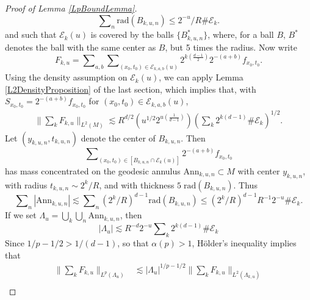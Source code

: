 \begin{proof}[Proof of Lemma \ref{LpBoundLemma}]
%
\begin{equation}
    \sum\nolimits_n \text{rad}(B_{k,u,n}) \leq 2^{-u} / R \# \mathcal{E}_k.
\end{equation}
%
and such that $\mathcal{E}_k(u)$ is covered by the balls $\{ B_{k,u,n}^* \}$, where, for a ball $B$, $B^*$ denotes the ball with the same center as $B$, but 5 times the radius. Now write
%
\begin{equation}
    F_{k,u} = \sum\nolimits_{a,b} \sum\nolimits_{(x_0,t_0) \in \mathcal{E}_{k,a,b}(u)} 2^{k \left( \frac{d-1}{2} \right)} 2^{-(a+b)} f_{x_0,t_0}.
\end{equation}
%
Using the density assumption on $\mathcal{E}_k(u)$, we can apply Lemma \ref{L2DensityProposition} of the last section, which implies that, with ${S\!}_{x_0,t_0} = 2^{-(a+b)} f_{x_0,t_0}$ for $(x_0,t_0) \in \mathcal{E}_{k,a,b}(u)$,
%
\begin{equation} \label{DOIWAJOIAJVOIWAJFOIWF}
\begin{split}
    \Big\| \sum\nolimits_k F_{k,u} \Big\|_{L^2(M)} \lesssim R^{d/2} \left( u^{1/2} 2^{u \left( \frac{1}{d-1} \right)} \right) \left( \sum\nolimits_k 2^{k(d-1)} \# \mathcal{E}_k \right)^{1/2}.
\end{split}
\end{equation}
%
Let $(y_{k,u,n}, t_{k,u,n})$ denote the center of $B_{k,u,n}$. Then
%
\begin{equation}
    \sum\nolimits_{(x_0,t_0) \in [B_{k,u,n} \cap \mathcal{E}_k(u)]} 2^{-(a+b)} f_{x_0,t_0}
\end{equation}
%
has mass concentrated on the geodesic annulus $\text{Ann}_{k,u,n} \subset M$ with center $y_{k,u,n}$, with radius $t_{k,u,n} \sim 2^{k} / R$, and with thickness $5\; \text{rad}(B_{k,u,n})$. Thus
%
\begin{equation}
    \sum\nolimits_n |\text{Ann}_{k,u,n}| \lesssim \sum\nolimits_{n} (2^{k} / R)^{d-1} \text{rad}(B_{k,u,n}) \leq (2^{k}/R)^{d-1} R^{-1} 2^{-u} \# \mathcal{E}_k.
\end{equation}
%
If we set $\Lambda_u = \bigcup_k \bigcup_n \text{Ann}_{k,u,n}$, then
%
\begin{equation}
    |\Lambda_u| \lesssim R^{-d} 2^{-u} \sum\nolimits_k 2^{k(d-1)} \# \mathcal{E}_k
\end{equation}
%
Since $1/p - 1/2 > 1/(d-1)$, so that $\alpha(p) > 1$, H\"{o}lder's inequality implies that
%
\begin{equation}
\begin{split}
    \Big\| \sum\nolimits_k F_{k,u} \Big\|_{L^p(\Lambda_u)} &\lesssim |\Lambda_u|^{1/p - 1/2} \Big\| \sum\nolimits_k F_{k,u} \Big\|_{L^2(\Lambda_{k,u})}\\

\end{split}
\end{equation}
\end{proof}

